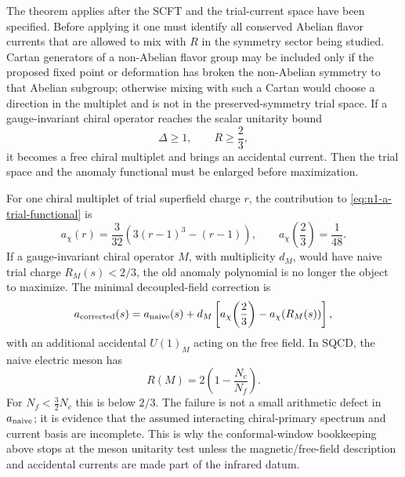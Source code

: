 The theorem applies after the SCFT and the trial-current space have been
specified.  Before applying it one must identify all conserved Abelian flavor
currents that are allowed to mix with \(R\) in the symmetry sector being
studied.  Cartan generators of a non-Abelian flavor group may be included only
if the proposed fixed point or deformation has broken the non-Abelian symmetry
to that Abelian subgroup; otherwise mixing with such a Cartan would choose a
direction in the multiplet and is not in the preserved-symmetry trial space.
If a gauge-invariant chiral operator reaches the scalar unitarity bound
\[
  \Delta\ge1,\qquad R\ge\frac23,
\]
it becomes a free chiral multiplet and brings an accidental current.  Then
the trial space and the anomaly functional must be enlarged before
maximization.

\begin{example}
\label{ex:n1-accidental-symmetry-a-correction}
For one chiral multiplet of trial superfield charge \(r\), the contribution to
\eqref{eq:n1-a-trial-functional} is
\begin{equation}
  a_\chi(r)
  =
  \frac3{32}\left(3(r-1)^3-(r-1)\right),
  \qquad
  a_\chi\!\left(\frac23\right)=\frac1{48}.
  \label{eq:chiral-multiplet-a-contribution}
\end{equation}
If a gauge-invariant chiral operator \(M\), with multiplicity \(d_M\), would
have naive trial charge \(R_M(s)<2/3\), the old anomaly polynomial is no
longer the object to maximize.  The minimal decoupled-field correction is
\begin{equation}
  a_{\rm corrected}(s)
  =
  a_{\rm naive}(s)
  +
  d_M\left[
    a_\chi\!\left(\frac23\right)-a_\chi(R_M(s))
  \right],
  \label{eq:a-max-accidental-correction}
\end{equation}
with an additional accidental \(U(1)_M\) acting on the free field.  In SQCD,
the naive electric meson has
\[
  R(M)=2\left(1-\frac{N_c}{N_f}\right).
\]
For \(N_f<\frac32N_c\) this is below \(2/3\).  The failure is not a small
arithmetic defect in \(a_{\rm naive}\); it is evidence that the assumed
interacting chiral-primary spectrum and current basis are incomplete.  This is
why the conformal-window bookkeeping above stops at the meson unitarity test
unless the magnetic/free-field description and accidental currents are made
part of the infrared datum.
\end{example}


